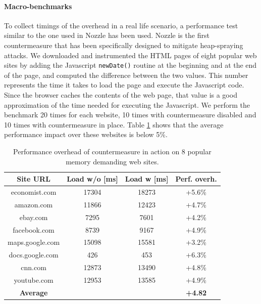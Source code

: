 \paragraph{Macro-benchmarks}
To collect timings of the overhead in a real life scenario, a performance test similar to the one used in Nozzle \cite{nozzle08tr} has been used. Nozzle is the first countermeasure that has been specifically designed to mitigate heap-spraying attacks.
We downloaded and instrumented the HTML pages of eight popular web sites by adding the Javascript \texttt{newDate()} routine at the beginning and at the end of the page, and computed the difference between the two values. This number represents the time it takes to load the page and execute the Javascript code. Since the browser caches the contents of the web page, that value is a good approximation of the time needed for executing the Javascript.
We perform the benchmark 20 times for each website, 10 times with countermeasure disabled and 10 times with countermeasure in place. Table \ref{perfpopular} shows that the average performance impact over these websites is below 5\%.

\begin{table}[htdp]
\begin{center}
\begin{tabular}{|c|c|c|c|} 
\hline
\bf{Site URL} & \bf{Load w/o [ms]} & \bf{Load w [ms]} & \bf{Perf. overh.} \\
\hline
economist.com 	& 	17304 	& 	18273	&  +5.6\% \\ 
amazon.com    	&      11866  	&  	12423 	&  +4.7\% \\
ebay.com 		&      7295  	&  	7601  	&+4.2\% \\
facebook.com 	&      8739  	&  	9167 	& +4.9\%\\ 
maps.google.com &  15098	&	15581       & +3.2\%\\
docs.google.com	& 426	&	453		& +6.3\%\\
cnn.com     	&      12873 	&  	13490 	&+4.8\%\\ 
youtube.com 	&      12953 	&  	13585    	& +4.9\%\\
\hline
\bf{Average}  &   &   & \bf{+4.82}\\ 
\hline
\end{tabular}
\end{center}
\caption{{ Performance overhead of countermeasure in action on 8 popular memory demanding web sites.}}
\label{perfpopular}
\end{table} 

